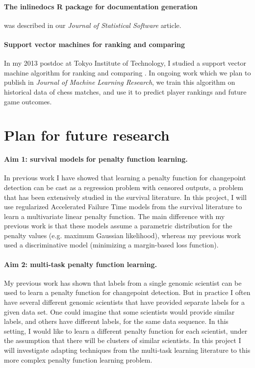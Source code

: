 \documentclass{article}
\begin{document}
\paragraph{The inlinedocs R package for documentation generation} was
described in our \emph{Journal of Statistical Software}
\citep{hocking13:inlinedocs} article.


\paragraph{Support vector machines for ranking and comparing} In my
2013 postdoc at Tokyo Institute of Technology, I studied a support
vector machine algorithm for ranking and comparing
\citep{svmcompare}. In ongoing work which we plan to publish in
\emph{Journal of Machine Learning Research}, we train this
algorithm on historical data of chess matches, and use it to predict
player rankings and future game outcomes.

\section{Plan for future research}

\paragraph{Aim 1: survival models for penalty function learning.} In
previous work I have showed that learning a penalty function for
changepoint detection can be cast as a regression problem with
censored outputs, a problem that has been extensively studied in the
survival literature. In this project, I will use regularized Accelerated Failure
Time models from the survival literature to learn a multivariate
linear penalty function. The main difference with my previous work is
that these models assume a parametric distribution for the penalty values
(e.g. maximum Gaussian likelihood), whereas my previous
work used a discriminative model (minimizing a margin-based loss
function).

\paragraph{Aim 2: multi-task penalty function learning.} My previous
work has shown that labels from a single genomic scientist can be used to
learn a penalty function for changepoint detection. But in practice I
often have several different genomic scientists that have provided
separate labels for a given data set. One could imagine that some
scientists would provide similar labels, and others have different
labels, for the same data sequence. In this setting, I would like to
learn a different penalty function for each scientist, under the
assumption that there will be clusters of similar scientists. In this
project I will investigate adapting techniques from the multi-task
learning literature to this more complex penalty function learning problem.
\end{document}

